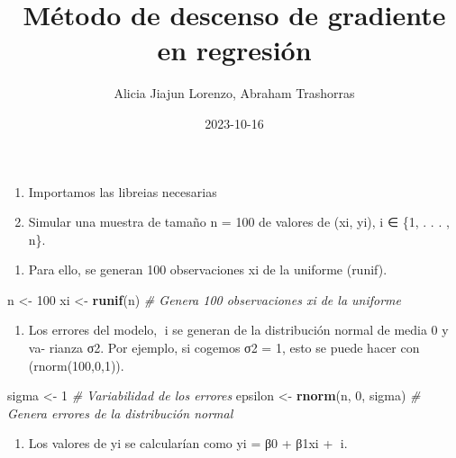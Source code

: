 \documentclass[
]{article}
\title{Método de descenso de gradiente en regresión}
\author{Alicia Jiajun Lorenzo, Abraham Trashorras}
\date{2023-10-16}
\newenvironment{Shaded}{\begin{snugshade}}{\end{snugshade}}
\newcommand{\CommentTok}[1]{\textcolor[rgb]{0.56,0.35,0.01}{\textit{#1}}}
\newcommand{\DecValTok}[1]{\textcolor[rgb]{0.00,0.00,0.81}{#1}}
\newcommand{\FunctionTok}[1]{\textcolor[rgb]{0.13,0.29,0.53}{\textbf{#1}}}
\newcommand{\NormalTok}[1]{#1}
\newcommand{\OtherTok}[1]{\textcolor[rgb]{0.56,0.35,0.01}{#1}}
\providecommand{\tightlist}{%
  \setlength{\itemsep}{0pt}\setlength{\parskip}{0pt}}
\begin{document}
\maketitle

\begin{enumerate}
\def\labelenumi{\arabic{enumi}.}
\setcounter{enumi}{-1}
\item
  Importamos las libreias necesarias
\item
  Simular una muestra de tamaño n = 100 de valores de (xi, yi), i ∈ \{1,
  . . . , n\}.
\end{enumerate}

\begin{enumerate}
\def\labelenumi{\alph{enumi})}
\tightlist
\item
  Para ello, se generan 100 observaciones xi de la uniforme (runif).
\end{enumerate}

\begin{Shaded}
\begin{Highlighting}[]
\NormalTok{n }\OtherTok{\textless{}{-}} \DecValTok{100}
\NormalTok{xi }\OtherTok{\textless{}{-}} \FunctionTok{runif}\NormalTok{(n)  }\CommentTok{\# Genera 100 observaciones xi de la uniforme }
\end{Highlighting}
\end{Shaded}

\begin{enumerate}
\def\labelenumi{\alph{enumi})}
\setcounter{enumi}{1}
\tightlist
\item
  Los errores del modelo, i se generan de la distribución normal de
  media 0 y va- rianza σ2. Por ejemplo, si cogemos σ2 = 1, esto se puede
  hacer con (rnorm(100,0,1)).
\end{enumerate}

\begin{Shaded}
\begin{Highlighting}[]
\NormalTok{sigma }\OtherTok{\textless{}{-}} \DecValTok{1}      \CommentTok{\# Variabilidad de los errores}
\NormalTok{epsilon }\OtherTok{\textless{}{-}} \FunctionTok{rnorm}\NormalTok{(n, }\DecValTok{0}\NormalTok{, sigma)  }\CommentTok{\# Genera errores de la distribución normal}
\end{Highlighting}
\end{Shaded}

\begin{enumerate}
\def\labelenumi{\alph{enumi})}
\setcounter{enumi}{2}
\tightlist
\item
  Los valores de yi se calcularían como yi = β0 + β1xi + i.
\end{enumerate}
\end{document}

